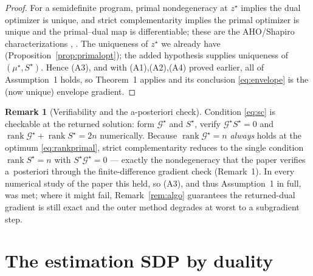 \documentclass[11pt]{article}
\theoremstyle{definition}
\newtheorem{remark}{Remark}
\DeclareMathOperator{\rank}{rank}
\begin{document}
\begin{proof}
For a semidefinite program, primal nondegeneracy at $z^\star$ implies the dual
optimizer is unique, and strict complementarity implies the primal optimizer is
unique and the primal--dual map is differentiable; these are the AHO/Shapiro
characterizations \cite[Thm.~10, Thm.~15]{AHO}, \cite[Thm.~4.1]{Shapiro97}. The
uniqueness of $z^\star$ we already have (Proposition~\ref{prop:primalopt}); the
added hypothesis supplies uniqueness of $(\mu^\star,S^\star)$. Hence (A3), and
with (A1),(A2),(A4) proved earlier, all of Assumption~1 holds, so Theorem~1
applies and its conclusion \eqref{eq:envelope} is the (now unique) envelope
gradient.
\end{proof}

\begin{remark}[Verifiability and the a-posteriori check]\label{rem:verify}
Condition \eqref{eq:sc} is checkable at the returned solution: form $\mathcal
G^\star$ and $S^\star$, verify $\mathcal G^\star S^\star=0$ and $\rank\mathcal
G^\star+\rank S^\star=2n$ numerically. Because $\rank\mathcal G^\star=n$
\emph{always} holds at the optimum \eqref{eq:rankprimal}, strict complementarity
reduces to the single condition $\rank S^\star=n$ with $S^\star\mathcal G^\star=0$
--- exactly the nondegeneracy that the paper verifies a~posteriori through the
finite-difference gradient check (Remark~1). In every numerical study of the
paper this held, so (A3), and thus Assumption~1 in full, was met; where it might
fail, Remark~\ref{rem:algo} guarantees the returned-dual gradient is still exact
and the outer method degrades at worst to a subgradient step.
\end{remark}

\section{The estimation SDP by duality}\label{sec:est}
\end{document}
